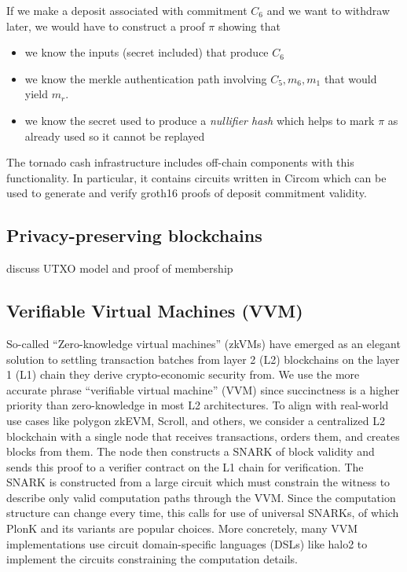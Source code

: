 \noindent If we make a deposit associated with commitment $C_6$ and we want to withdraw later, we would have to construct a proof $\pi$ showing that\\
\begin{itemize}
    \item we know the inputs (secret included) that produce $C_6$
    \item we know the merkle authentication path involving $C_5, m_6, m_1$ that would yield $m_r$.
    \item we know the secret used to produce a \textit{nullifier hash} which helps to mark $\pi$ as already used so it cannot be replayed
\end{itemize}

\noindent The tornado cash infrastructure includes off-chain components with this functionality. In particular, it contains circuits written in Circom which can be used to generate and verify groth16 proofs of deposit commitment validity.\\

\subsection{Privacy-preserving blockchains}
\noindent discuss UTXO model and proof of membership\\

\subsection{Verifiable Virtual Machines (VVM)}
\noindent So-called ``Zero-knowledge virtual machines'' (zkVMs) have emerged as an elegant solution to settling transaction batches from layer 2 (L2) blockchains on the layer 1 (L1) chain they derive crypto-economic security from. We use the more accurate phrase ``verifiable virtual machine'' (VVM) since succinctness is a higher priority than zero-knowledge in most L2 architectures. To align with real-world use cases like polygon zkEVM, Scroll, and others, we consider a centralized L2 blockchain with a single node that receives transactions, orders them, and creates blocks from them. The node then constructs a SNARK of block validity and sends this proof to a verifier contract on the L1 chain for verification. The SNARK is constructed from a large circuit which must constrain the witness to describe only valid computation paths through the VVM. Since the computation structure can change every time, this calls for use of universal SNARKs, of which PlonK and its variants are popular choices. More concretely, many VVM implementations use circuit domain-specific languages (DSLs) like halo2 to implement the circuits constraining the computation details.\\

